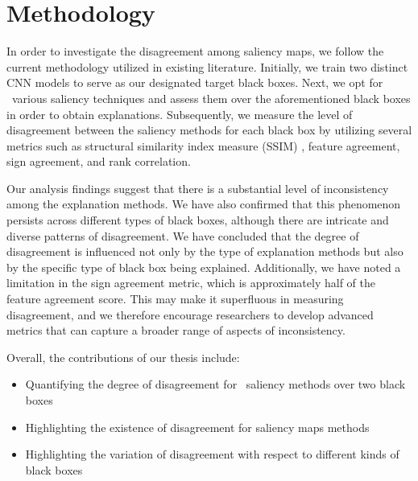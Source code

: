 \section{Methodology}
\label{sec:methodology}

In order to investigate the disagreement among saliency maps, we follow the current methodology utilized in existing literature. Initially, we train two distinct CNN models to serve as our designated target black boxes. Next, we opt for \numExperimentedMethods\ various saliency techniques and assess them over the aforementioned black boxes in order to obtain explanations. Subsequently, we measure the level of disagreement between the saliency methods for each black box by utilizing several metrics such as structural similarity index measure (SSIM) \cite{ssim}, feature agreement, sign agreement, and rank correlation.

Our analysis findings suggest that there is a substantial level of inconsistency among the explanation methods. We have also confirmed that this phenomenon persists across different types of black boxes, although there are intricate and diverse patterns of disagreement. We have concluded that the degree of disagreement is influenced not only by the type of explanation methods but also by the specific type of black box being explained. Additionally, we have noted a limitation in the sign agreement metric, which is approximately half of the feature agreement score. This may make it superfluous in measuring disagreement, and we therefore encourage researchers to develop advanced metrics that can capture a broader range of aspects of inconsistency.

Overall, the contributions of our thesis include:
\begin{itemize}
    \item Quantifying the degree of disagreement for \numExperimentedMethods\ saliency methods over two black boxes
    \item Highlighting the existence of disagreement for saliency maps methods
    \item Highlighting the variation of disagreement with respect to different kinds of black boxes
\end{itemize}

